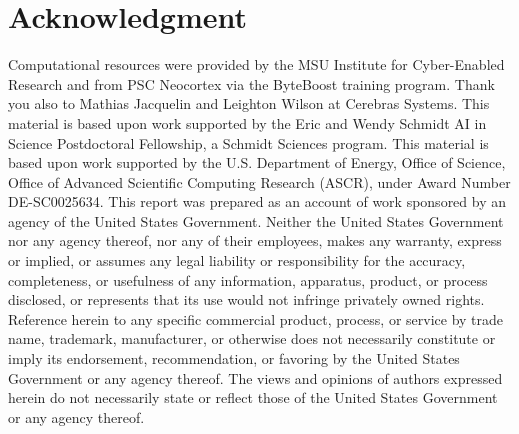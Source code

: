 \section*{Acknowledgment}

Computational resources were provided by the MSU Institute for Cyber-Enabled Research and from PSC Neocortex via the ByteBoost training program.
Thank you also to Mathias Jacquelin and Leighton Wilson at Cerebras Systems.
This material is based upon work supported by the Eric and Wendy Schmidt AI in Science Postdoctoral Fellowship, a Schmidt Sciences program.
This material is based upon work supported by the U.S. Department of Energy, Office of Science, Office of Advanced Scientific Computing Research (ASCR), under Award Number DE-SC0025634.
This report was prepared as an account of work sponsored by an agency of the United States Government.
Neither the United States Government nor any agency thereof, nor any of their employees, makes any warranty, express or implied, or assumes any legal liability or responsibility for the accuracy, completeness, or usefulness of any information, apparatus, product, or process disclosed, or represents that its use would not infringe privately owned rights.
Reference herein to any specific commercial product, process, or service by trade name, trademark, manufacturer, or otherwise does not necessarily constitute or imply its endorsement, recommendation, or favoring by the United States Government or any agency thereof.
The views and opinions of authors expressed herein do not necessarily state or reflect those of the United States Government or any agency thereof.
